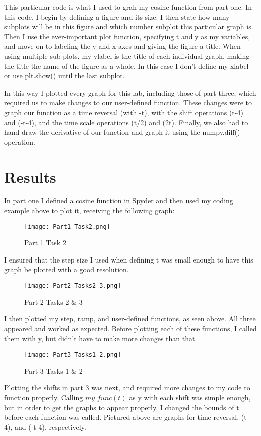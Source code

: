 \documentclass[12pt]{report}
\begin{document}
This particular code is what I used to grah my cosine function from part one. In this code, I begin by defining a figure and its size. I then state how many subplots will be in this figure and which number subplot this particular graph is. Then I use the ever-important plot function, specifying t and y as my variables, and move on to labeling the y and x axes and giving the figure a title. When using multiple sub-plots, my ylabel is the title of each individual graph, making the title the name of the figure as a whole. In this case I don't define my xlabel or use plt.show() until the last subplot.

In this way I plotted every graph for this lab, including those of part three, which required us to make changes to our user-defined function. These changes were to graph our function as a time reversal (with -t), with the shift operations (t-4) and (-t-4), and the time scale operations (t/2) and (2t). Finally, we also had to hand-draw the derivative of our function and graph it using the numpy.diff() operation. 

 
 \section{Results}
 
 In part one I defined a cosine function in Spyder and then used my coding example above to plot it, receiving the following graph: 
 \begin{figure}[H]
    \centering
    \texttt{[image: Part1\_Task2.png]}
    \caption{Part 1 Task 2}
\end{figure}
 I ensured that the step size I used when defining t was small enough to have this graph be plotted with a good resolution. 
 \begin{figure}[H]
    \centering
    \texttt{[image: Part2\_Tasks2-3.png]}
    \caption{Part 2 Tasks 2 \& 3}
\end{figure}
 
 I then plotted my step, ramp, and user-defined functions, as seen above. All three appeared and worked as expected. Before plotting each of these functions, I called them with y, but didn't have to make more changes than that.
 
 \begin{figure}[H]
    \centering
    \texttt{[image: Part3\_Tasks1-2.png]}
    \caption{Part 3 Tasks 1 \& 2}
\end{figure}

 Plotting the shifts in part 3 was next, and required more changes to my code to function properly. Calling $my\_func(t)$ as y with each shift was simple enough, but in order to get the graphs to appear properly, I changed the bounds of t before each function was called. Pictured above are graphs for time reversal, (t-4), and (-t-4), respectively. 
\end{document}
